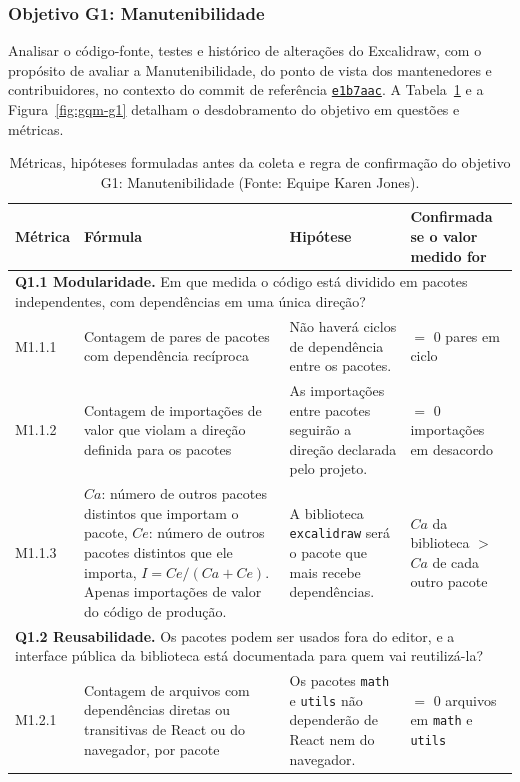 \documentclass[12pt]{article}
\newcommand{\commitref}{\href{https://github.com/excalidraw/excalidraw/commit/e1b7aacb356a492aa1e0fc6eb57b8896124027f0}{\texttt{e1b7aac}}}
\renewcommand{\arraystretch}{0.9}
\begin{document}
\subsubsection{Objetivo G1: Manutenibilidade}
\label{subsec:g1-manutenibilidade}

Analisar o código-fonte, testes e histórico de alterações do Excalidraw, com o propósito de avaliar a Manutenibilidade, do ponto de vista dos mantenedores e contribuidores, no contexto do commit de referência \commitref. A Tabela~\ref{tab:g1-metricas} e a Figura~\ref{fig:gqm-g1} detalham o desdobramento do objetivo em questões e métricas.

\begin{table}[!ht]
\centering
\caption{Métricas, hipóteses formuladas antes da coleta e regra de confirmação do objetivo G1: Manutenibilidade (Fonte: Equipe Karen Jones).}
\label{tab:g1-metricas}
\vspace{2pt}
\scriptsize
\setlength{\tabcolsep}{3pt}
\renewcommand{\arraystretch}{0.90}
\begin{tabular}{p{1.2cm}p{5.5cm}p{5.0cm}p{3.6cm}}
\toprule
\textbf{Métrica} & \textbf{Fórmula} & \textbf{Hipótese} & \textbf{Confirmada se o valor medido for} \\
\midrule
\multicolumn{4}{p{16.2cm}}{\textbf{Q1.1 Modularidade.} Em que medida o código está dividido em pacotes independentes, com dependências em uma única direção?} \\
M1.1.1 & Contagem de pares de pacotes com dependência recíproca & Não haverá ciclos de dependência entre os pacotes. & $=$ 0 pares em ciclo \\
M1.1.2 & Contagem de importações de valor que violam a direção definida para os pacotes & As importações entre pacotes seguirão a direção declarada pelo projeto. & $=$ 0 importações em desacordo \\
M1.1.3 & $Ca$: número de outros pacotes distintos que importam o pacote, $Ce$: número de outros pacotes distintos que ele importa, $I = Ce/(Ca+Ce)$. Apenas importações de valor do código de produção. & A biblioteca \texttt{excalidraw} será o pacote que mais recebe dependências. & $Ca$ da biblioteca $>$ $Ca$ de cada outro pacote \\
\midrule
\multicolumn{4}{p{16.2cm}}{\textbf{Q1.2 Reusabilidade.} Os pacotes podem ser usados fora do editor, e a interface pública da biblioteca está documentada para quem vai reutilizá-la?} \\
M1.2.1 & Contagem de arquivos com dependências diretas ou transitivas de React ou do navegador, por pacote & Os pacotes \texttt{math} e \texttt{utils} não dependerão de React nem do navegador. & $=$ 0 arquivos em \texttt{math} e \texttt{utils} \\

\end{tabular}
\end{table}
\end{document}
